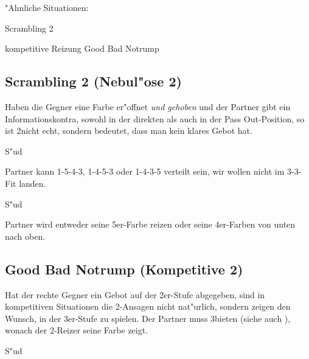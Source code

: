 "Ahnliche Situationen:
\bdsc
\item[(1\of)\sep{}pass\sep(2\of)\sep{}\kontra] \ra Scrambling 2\NT{}
\item[\dots\sep{}(2\anybid)] kompetitive Reizung \ra Good Bad Notrump
\edsc

\subsection{Scrambling 2\NT{} (Nebul"ose 2\SA)\label{scrambling2nt}}

Haben die Gegner eine Farbe er"offnet \emph{und gehoben} und der Partner
gibt ein Informationskontra, sowohl in der direkten als auch in der Pass
Out-Position, so ist 2\SA nicht echt, sondern bedeutet, dass man kein klares
Gebot hat.

\dealerW
S"ud \\

Partner kann 1-5-4-3, 1-4-5-3 oder 1-4-3-5 verteilt sein,
wir wollen nicht im 3-3-Fit landen.

S"ud \\

Partner wird entweder seine 5er-Farbe reizen oder seine 4er-Farben von unten
nach oben.

\subsection{Good Bad Notrump (Kompetitive 2\SA)\label{goodbadnt}}

Hat der rechte Gegner ein Gebot auf der 2er-Stufe abgegeben, sind in
kompetitiven Situationen die 2\SA-Ansagen nicht nat"urlich, sondern zeigen den
Wunsch, in der 3er-Stufe zu spielen. Der Partner muss 3\tre bieten (siehe auch
), wonach der 2\SA-Reizer seine Farbe zeigt.

\dealerW
S"ud \\

